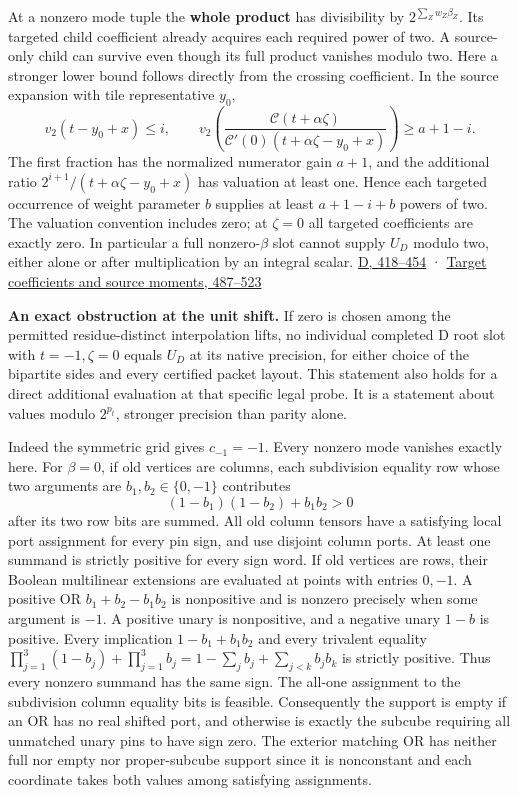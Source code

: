 \documentclass[11pt,a4paper]{article}
\begin{document}
At a nonzero mode tuple the \textbf{whole product} has divisibility by
\(2^{\sum_Z w_Z\beta_Z}\). Its targeted child coefficient already
acquires each required power of two. A source-only child can survive
even though its full product vanishes modulo two. Here a stronger lower
bound follows directly from the crossing coefficient. In the source
expansion with tile representative \(y_0\), \[
 v_2(t-y_0+x)\le i,\qquad
 v_2\!\left(\frac{\mathcal C(t+\alpha\zeta)}
                  {\mathcal C'(0)(t+\alpha\zeta-y_0+x)}\right)
                 \ge a+1-i.
\] The first fraction has the normalized numerator gain \(a+1\), and the
additional ratio \(2^{i+1}/(t+\alpha\zeta-y_0+x)\) has valuation at
least one. Hence each targeted occurrence of weight parameter \(b\)
supplies at least \(a+1-i+b\) powers of two. The valuation convention
includes zero; at \(\zeta=0\) all targeted coefficients are exactly
zero. In particular a full nonzero-\(\beta\) slot cannot supply \(U_D\)
modulo two, either alone or after multiplication by an integral scalar.
\href{https://github.com/openai/math/blob/main/preprints/The-Exponential-Time-Hypothesis-is-False-October-25-2026/build/quantitative-contraction.tex\#L418}{D,
418--454} ·
\href{https://github.com/openai/math/blob/main/preprints/The-Exponential-Time-Hypothesis-is-False-October-25-2026/build/quantitative-contraction.tex\#L487}{Target
coefficients and source moments, 487--523}

\textbf{An exact obstruction at the unit shift.} If zero is chosen among
the permitted residue-distinct interpolation lifts, no individual
completed D root slot with \(t=-1,\zeta=0\) equals \(U_D\) at its native
precision, for either choice of the bipartite sides and every certified
packet layout. This statement also holds for a direct additional
evaluation at that specific legal probe. It is a statement about values
modulo \(2^{p_t}\), stronger precision than parity alone.

Indeed the symmetric grid gives \(c_{-1}=-1\). Every nonzero mode
vanishes exactly here. For \(\beta=0\), if old vertices are columns,
each subdivision equality row whose two arguments are
\(b_1,b_2\in\{0,-1\}\) contributes \[
 (1-b_1)(1-b_2)+b_1b_2>0
\] after its two row bits are summed. All old column tensors have a
satisfying local port assignment for every pin sign, and use disjoint
column ports. At least one summand is strictly positive for every sign
word. If old vertices are rows, their Boolean multilinear extensions are
evaluated at points with entries \(0,-1\). A positive OR
\(b_1+b_2-b_1b_2\) is nonpositive and is nonzero precisely when some
argument is \(-1\). A positive unary is nonpositive, and a negative
unary \(1-b\) is positive. Every implication \(1-b_1+b_1b_2\) and every
trivalent equality
\(\prod_{j=1}^3(1-b_j)+\prod_{j=1}^3b_j=1-\sum_j b_j+\sum_{j<k}b_jb_k\)
is strictly positive. Thus every nonzero summand has the same sign. The
all-one assignment to the subdivision column equality bits is feasible.
Consequently the support is empty if an OR has no real shifted port, and
otherwise is exactly the subcube requiring all unmatched unary pins to
have sign zero. The exterior matching OR has neither full nor empty nor
proper-subcube support since it is nonconstant and each coordinate takes
both values among satisfying assignments.
\end{document}
